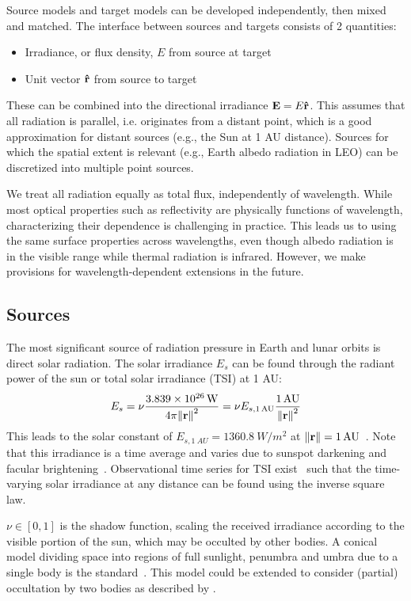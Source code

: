 \documentclass[parskip=full,DIV=15]{scrartcl}
\begin{document}
Source models and target models can be developed independently, then mixed and matched. The interface between sources and targets consists of 2 quantities:
\begin{itemize}
   \item Irradiance, or flux density, $E$ from source at target
   \item Unit vector $\vu r$ from source to target
\end{itemize}
These can be combined into the directional irradiance $\vb E=E \vu r$. This assumes that all radiation is parallel, i.e. originates from a distant point, which is a good approximation for distant sources (e.g., the Sun at 1 AU distance). Sources for which the spatial extent is relevant (e.g., Earth albedo radiation in LEO) can be discretized into multiple point sources.

We treat all radiation equally as total flux, independently of wavelength. While most optical properties such as reflectivity are physically functions of wavelength, characterizing their dependence is challenging in practice. This leads us to using the same surface properties across wavelengths, even though albedo radiation is in the visible range while thermal radiation is infrared. However, we make provisions for wavelength-dependent extensions in the future.



\subsection{Sources}
The most significant source of radiation pressure in Earth and lunar orbits is direct solar radiation. The solar irradiance $E_s$ can be found through the radiant power of the sun or total solar irradiance (TSI) at 1 AU:
\begin{align}
   E_s = \nu\frac{\SI{3.839e26}{W}}{4\pi \norm{\vb r}^2} = \nu E_{s,\SI{1}{AU}}\frac{\SI{1}{AU}}{\norm{\vb r}^2}
\end{align}
This leads to the solar constant of $E_{s,\SI{1}{AU}}=\SI{1360.8}{W/m^2}$ at $\norm{\vb r}=\SI{1}{AU}$~\cite{Wild2012}. Note that this irradiance is a time average and varies due to sunspot darkening and facular brightening~\cite{Kopp2016}. Observational time series for TSI exist~\cite{Dewitte2017} such that the time-varying solar irradiance at any distance can be found using the inverse square law.

$\nu\in[0,1]$ is the shadow function, scaling the received irradiance according to the visible portion of the sun, which may be occulted by other bodies. A conical model dividing space into regions of full sunlight, penumbra and umbra due to a single body is the standard~\cite{Montenbruck2000}. This model could be extended to consider (partial) occultation by two bodies as described by \textcite{Zhang2019}.
\end{document}
